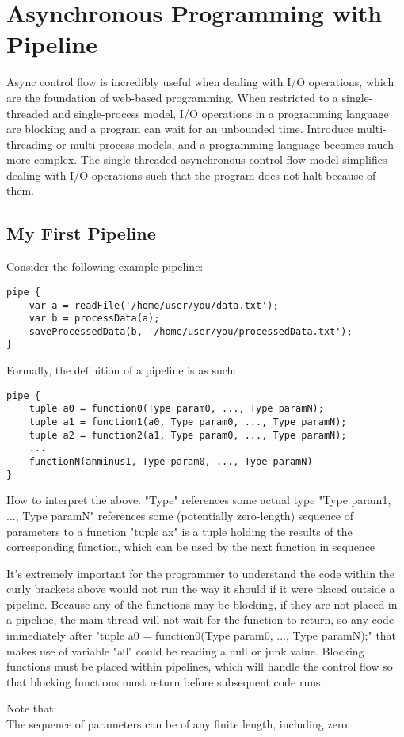 \documentclass[./LRM_main.tex]{subfiles}
\begin{document}


\chapter{Asynchronous Programming with Pipeline}
Async control flow is incredibly useful when dealing with I/O operations, which are the foundation of web-based programming. When restricted to a single-threaded and single-process model, I/O operations in a programming language are blocking and a program can wait for an unbounded time. Introduce multi-threading or multi-process models, and a programming language becomes much more complex. The single-threaded asynchronous control flow model simplifies dealing with I/O operations such that the program does not halt because of them.


\section{My First Pipeline}
Consider the following example pipeline:

\begin{lstlisting}
pipe {
	var a = readFile('/home/user/you/data.txt'); 
 	var b = processData(a); 
	saveProcessedData(b, '/home/user/you/processedData.txt');
}
\end{lstlisting}
Formally, the definition of a pipeline is as such:
\begin{lstlisting}
pipe {
	tuple a0 = function0(Type param0, ..., Type paramN); 
	tuple a1 = function1(a0, Type param0, ..., Type paramN); 
	tuple a2 = function2(a1, Type param0, ..., Type paramN);
	... 
	functionN(anminus1, Type param0, ..., Type paramN)
}
\end{lstlisting}
How to interpret the above:
"Type" references some actual type
"Type param1, ..., Type paramN" references some (potentially zero-length) sequence of parameters to a function
"tuple ax" is a tuple holding the results of the corresponding function, which can be used by the next function in sequence

It's extremely important for the programmer to understand the code within the curly brackets above would not run the way it should if it were placed outside a pipeline. Because any of the functions may be blocking, if they are not placed in a pipeline, the main thread will not wait for the function to return, so any code immediately after "tuple a0 = function0(Type param0, ..., Type paramN);" that makes use of variable "a0" could be reading a null or junk value. Blocking functions must be placed within pipelines, which will handle the control flow so that blocking functions must return before subsequent code runs.
\begin{adjustwidth}{1cm}{2cm}
Note that:\\
The sequence of parameters can be of any finite length, including zero.
\end{adjustwidth}
\end{document}
